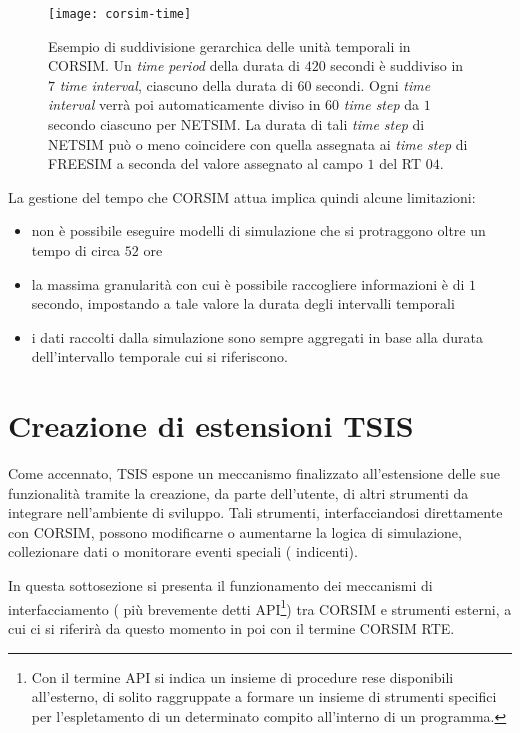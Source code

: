 \begin{figure}[ht]
\centering
\texttt{[image: corsim-time]}
\caption[Gestione del tempo in \acs{CORSIM}]{Esempio di suddivisione gerarchica delle unità temporali in \acs{CORSIM}. Un \emph{time period} della durata di $420$ secondi è suddiviso in $7$ \emph{time interval}, ciascuno della durata di $60$ secondi. Ogni \emph{time interval} verrà poi automaticamente diviso in $60$ \emph{time step} da $1$ secondo ciascuno per \acs{NETSIM}. La durata di tali \emph{time step} di \acs{NETSIM} può o meno coincidere con quella assegnata ai \emph{time step} di \acs{FREESIM} a seconda del valore assegnato al campo $1$ del \acs{RT} $04$.}
\label{fig:corsim-time}
\end{figure}

La gestione del tempo che \acs{CORSIM} attua implica quindi alcune limitazioni:
\begin{itemize}
    \item non è possibile eseguire modelli di simulazione che si protraggono oltre un tempo di circa $52$ ore
    \item la massima granularità con cui è possibile raccogliere informazioni è di $1$ secondo, impostando a tale valore la durata degli intervalli temporali
    \item i dati raccolti dalla simulazione sono sempre aggregati in base alla durata dell'intervallo temporale cui si riferiscono.
\end{itemize}

\section{Creazione di estensioni TSIS}
Come accennato, \acs{TSIS} espone un meccanismo finalizzato all'estensione delle sue funzionalità tramite la creazione, da parte dell'utente, di altri strumenti da integrare nell'ambiente di sviluppo. Tali strumenti, interfacciandosi direttamente con \acs{CORSIM}, possono modificarne o aumentarne la logica di simulazione, collezionare dati o monitorare eventi speciali (\eg{} indicenti).

In questa sottosezione si presenta il funzionamento dei meccanismi di interfacciamento (\ie{} più brevemente detti \acs{API}\footnote{Con il termine
\acf{API} si indica un insieme di procedure rese disponibili all'esterno, di solito raggruppate a formare un insieme di strumenti specifici per l'espletamento di un determinato compito all'interno di un programma.}) tra \acs{CORSIM} e strumenti esterni, a cui ci si riferirà da questo momento in poi con il termine \acs{CORSIM} \acs{RTE}.

